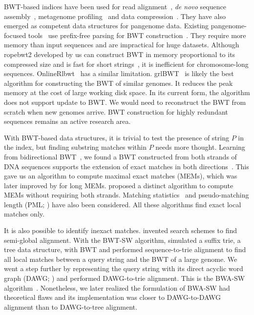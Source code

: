 \documentclass[webpdf,contemporary,large,namedate]{oup-authoring-template}%
\begin{document}
BWT-based indices have been used for read alignment~\citep{Langmead:2009aa,Li:2009uq,Li:2009aa},
\emph{de novo} sequence assembly~\citep{Simpson:2012aa},
metagenome profiling~\citep{Kim:2016aa} and
data compression~\citep{Cox:2012ly}.
They have also emerged as competent data structures for pangenome data.
Existing pangenome-focused tools~\citep{Rossi:2022aa,Ahmed:2021aa,Zakeri:2024aa}
use prefix-free parsing for BWT construction~\citep{Boucher:2019aa}.
They require more memory than input sequences and are impractical for huge datasets.
Although ropebwt2 developed by us can construct BWT in memory proportional to its compressed size and is fast for short strings~\citep{Li:2014ab},
it is inefficient for chromosome-long sequences.
OnlineRlbwt~\citep{DBLP:journals/tcs/BannaiGI20} has a similar limitation.
grlBWT~\citep{DBLP:journals/iandc/DiazDominguezN23} is likely the best algorithm for constructing the BWT of similar genomes.
It reduces the peak memory at the cost of large working disk space.
In its current form, the algorithm does not support update to BWT.
We would need to reconstruct the BWT from scratch when new genomes arrive.
BWT construction for highly redundant sequences remains an active research area.

With BWT-based data structures, it is trivial to test the presence of string $P$ in the index,
but finding substring matches within $P$ needs more thought.
Learning from bidirectional BWT~\citep{DBLP:conf/bibm/LamLTWWY09},
we found a BWT constructed from both strands of DNA sequences supports the extension of exact matches in both directions~\citep{Li:2012fk}.
This gave us an algorithm to compute maximal exact matches (MEMs), which was later improved by \citet{DBLP:conf/dlt/Gagie24} for long MEMs.
\citet{DBLP:journals/tcs/BannaiGI20} proposed a distinct algorithm to compute MEMs without requiring both strands.
Matching statistics~\citep{DBLP:journals/algorithmica/ChangL94} and pseudo-matching length (PML; \citealt*{Ahmed:2021aa}) have also been considered.
All these algorithms find exact local matches only.

It is also possible to identify inexact matches.
\citet{DBLP:journals/tcs/KucherovST16} invented search schemes to find semi-global alignment.
With the BWT-SW algorithm, \citet{Lam:2008aa} simulated a suffix trie, a tree data structure, with BWT
and performed sequence-to-trie alignment to find all local matches
between a query string and the BWT of a large genome.
We went a step further by representing the query string with its direct acyclic word graph (DAWG; \citealt*{DBLP:journals/eatcs/BlumerBEHM83})
and performed DAWG-to-trie alignment.
This is the BWA-SW algorithm~\citep{Li:2010fk}.
Nonetheless, we later realized the formulation of BWA-SW had theoretical flaws
and its implementation was closer to DAWG-to-DAWG alignment than to DAWG-to-tree alignment.
\end{document}
